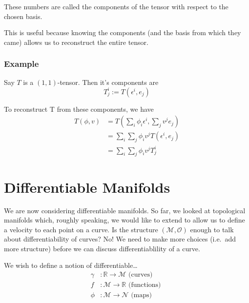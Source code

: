 \documentclass[
  letterpaper,
  DIV=11,
  numbers=noendperiod,
  oneside]{scrreprt}
\begin{document}
These numbers are called the components of the tensor with respect to
the chosen basis.

This is useful because knowing the components (and the basis from which
they came) allows us to reconstruct the entire tensor.

\hypertarget{example-6}{%
\subsection{Example}\label{example-6}}

Say \(T\) is a \((1,1)\)-tensor. Then it's components are
\begin{equation}
    T^i_j := T(\epsilon^i, e_j)
\end{equation}

To reconstruct T from these components, we have \begin{align}
T(\phi, v) &= T\left(\sum_i \phi_i\epsilon^i, \sum_j v^je_j \right) \\
    & = \sum_i\sum_j \phi_iv^j T(\epsilon^i, e_j) \\ 
    &= \sum_i\sum_j \phi_iv^jT^i_j
\end{align}


\hypertarget{differentiable-manifolds}{%
\chapter{Differentiable Manifolds}\label{differentiable-manifolds}}

We are now considering differentiable manifolds. So far, we looked at
topological manifolds which, roughly speaking, we would like to extend
to allow us to define a velocity to each point on a curve. Is the
structure \((\mathcal{M}, \mathcal{O})\) enough to talk about
differentiability of curves? No! We need to make more choices (i.e.~add
more structure) before we can discuss differentiablility of a curve.

We wish to define a notion of differentiable\ldots{} \begin{align}
\gamma &:\mathbb{R} \to \mathcal{M} \text{  (curves)  } \\ 
f&:\mathcal{M} \to \mathbb{R} \text{  (functions)  } \\
\phi &: \mathcal{M} \to \mathcal{N} \text{  (maps)  } \\
\end{align}
\end{document}
